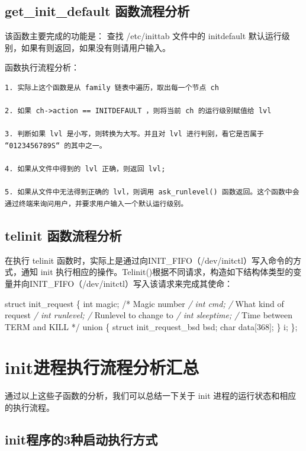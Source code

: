 \subsection{get\_init\_default 函数流程分析}

该函数主要完成的功能是： 查找 /etc/inittab 文件中的 initdefault
默认运行级别，如果有则返回，如果没有则请用户输入。

函数执行流程分析：

{\begin{shaded}\begin{verbatim}
1. 实际上这个函数是从 family 链表中遍历，取出每一个节点 ch

2. 如果 ch->action == INITDEFAULT ，则将当前 ch 的运行级别赋值给 lvl

3. 判断如果 lvl 是小写，则转换为大写。并且对 lvl 进行判别，看它是否属于 “0123456789S“ 的其中之一。

4. 如果从文件中得到的 lvl 正确，则返回 lvl; 

5. 如果从文件中无法得到正确的 lvl，则调用 ask_runlevel() 函数返回。这个函数中会通过终端来询问用户，并要求用户输入一个默认运行级别。
\end{verbatim}\end{shaded}}
\subsection{telinit 函数流程分析}

在执行 telinit
函数时，实际上是通过向INIT\_FIFO（/dev/initctl）写入命令的方式，通知 init
执行相应的操作。Telinit()根据不同请求，构造如下结构体类型的变量并向INIT\_FIFO（/dev/initctl）写入该请求来完成其使命：

struct init\_request \{ int magic; /* Magic number \emph{/ int cmd; /}
What kind of request \emph{/ int runlevel; /} Runlevel to change to
\emph{/ int sleeptime; /} Time between TERM and KILL */ union \{ struct
init\_request\_bsd bsd; char data{[}368{]}; \} i; \};

\section{init进程执行流程分析汇总}

通过以上这些子函数的分析，我们可以总结一下关于 init
进程的运行状态和相应的执行流程。

\subsection{init程序的3种启动执行方式}

